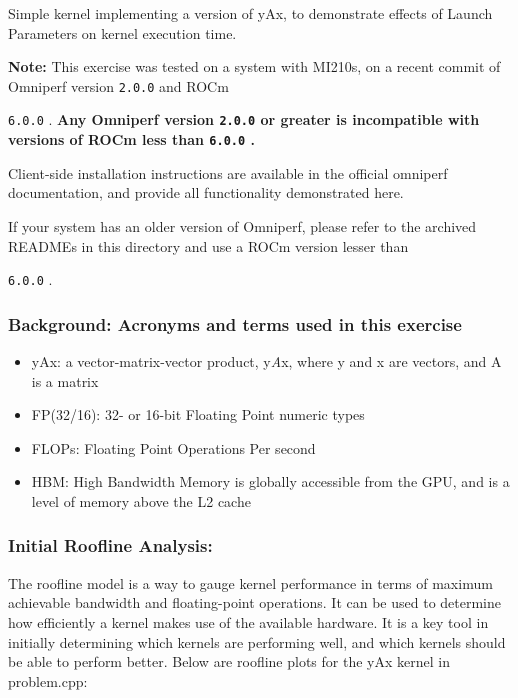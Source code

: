 \documentclass[
]{article}
\let\oldtexttt\texttt
\renewcommand{\texttt}[1]{
  \colorbox{Light}{\oldtexttt{#1}}
}
\begin{document}
Simple kernel implementing a version of yAx, to demonstrate effects of
Launch Parameters on kernel execution time.

\textbf{Note:} This exercise was tested on a system with MI210s, on a
recent commit of Omniperf version \texttt{2.0.0} and ROCm
\texttt{6.0.0}. \textbf{Any Omniperf version \texttt{2.0.0} or greater
is incompatible with versions of ROCm less than \texttt{6.0.0}.}

Client-side installation instructions are available in the official
omniperf documentation, and provide all functionality demonstrated here.

If your system has an older version of Omniperf, please refer to the
archived READMEs in this directory and use a ROCm version lesser than
\texttt{6.0.0}.

\subsubsection*{Background: Acronyms and terms used in this exercise}

\begin{itemize}
     
\item yAx: a vector-matrix-vector product, y\emph{A}x, where y and x are
vectors, and A is a matrix

\item FP(32/16): 32- or 16-bit Floating Point numeric types

\item FLOPs: Floating Point Operations Per second

\item HBM: High Bandwidth Memory is globally accessible from the GPU, and is a
level of memory above the L2 cache

\end{itemize}

\hypertarget{initial-roofline-analysis}{%
\subsubsection{Initial Roofline
Analysis:}\label{initial-roofline-analysis}}

The roofline model is a way to gauge kernel performance in terms of
maximum achievable bandwidth and floating-point operations. It can be
used to determine how efficiently a kernel makes use of the available
hardware. It is a key tool in initially determining which kernels are
performing well, and which kernels should be able to perform better.
Below are roofline plots for the yAx kernel in problem.cpp:
\end{document}
